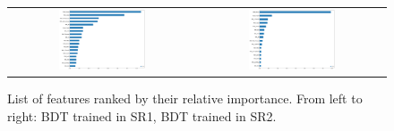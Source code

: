 \begin{figure}[tbh!]
 \begin{center}
 \begin{tabular}{cc}
 \includegraphics[width=0.48\textwidth]{figures/Part3/BDT/TTranking}&
 \includegraphics[width=0.48\textwidth]{figures/Part3/BDT/STranking}\\
 \end{tabular}
 \caption{List of features ranked by their relative importance. From left to right: \ac{BDT} trained in \ac{SR}1, \ac{BDT}  trained in \ac{SR}2.}
 \label{fig:Ranking}
 \end{center}
\end{figure}

